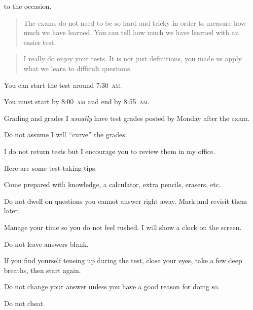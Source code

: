 \documentclass[t]{beamer}
\begin{document}
\begin{frame}{ to the occasion.}
%
	\hangpara \begin{quote}The exams do not need to be so hard and tricky in order to measure how much we have learned. You can tell how much we have learned with an easier test.
	\end{quote}
%
	\hangpara \begin{quote}I really do enjoy your tests. It is not just definitions, you made us apply what we learn to difficult questions.
	\end{quote}
%
\end{frame}

\begin{frame}{You can start the test around 7:30~\textsc{am}.}

\hangpara You must start by 8:00~\textsc{am} and end by 8:55~\textsc{am}.

\vspace{3\baselineskip}

\end{frame}

\begin{frame}{Grading and grades}
\hangpara I \emph{usually} have test grades posted by Monday after the exam.

\hangpara Do not assume I will “curve” the grades. 

\hangpara I do not return tests but I encourage you to review them in my office.
\end{frame}

\begin{frame}{Here are some test-taking tips.}

\hangpara Come prepared with knowledge, a calculator, extra pencils, erasers, etc.

\hangpara Do not dwell on questions you cannot answer right away. Mark and revisit them later.

\hangpara Manage your time so you do not feel rushed. I will show a clock on the screen.

\hangpara Do not leave answers blank.

\hangpara If you find yourself tensing up during the test, close your eyes, take a few deep breaths, then start again. 

\hangpara Do not change your answer unless you have a good reason for doing so.

\hangpara Do not cheat.

\end{frame}
\end{document}
